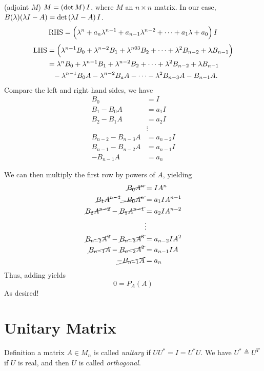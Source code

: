 \documentclass{article}
\begin{document}
(adjoint \(M\)) \(M = \del{\det M} I\), where \(M\) an \(n \times n\) matrix.
In our case,\(B(\lambda)(\lambda I - A) = \det \del{\lambda I - A} I\).
\[\mathrm{RHS} = \del{\lambda^n + a_n \lambda^{n-1} + a_{n-1}\lambda^{n-2} + \cdots + a_1 \lambda + a_0}I\]
\begin{align*}
  \mathrm{LHS} &= \del{\lambda^{n-1}B_0 + \lambda^{n-2}B_1 + \lambda^{n03}B_2 + \cdots + \lambda^2 B_{n-2} + \lambda B_{n-1}}\\
               &= \lambda^n B_0 + \lambda^{n-1} B_1 + \lambda^{n-2}B_2 + \cdots + \lambda^2 B_{n-2} + \lambda B_{n-1}\\
  &\phantom{=} - \lambda^{n-1} B_0 A - \lambda^{n-2}B_a A - \cdots - \lambda^{2}B_{n-3}A - B_{n-1}A.
\end{align*}
Compare the left and right hand sides, we have
\begin{align*}
  B_0 &= I\\
  B_1 - B_0A &= a_1 I\\
  B_2 - B_1 A &= a_2 I\\
     &\vdots\\
  B_{n-2} - B_{n-3}A &= a_{n-2}I\\
  B_{n-1} - B_{n-2}A&= a_{n-1}I\\
  -B_{n-1}A &= a_n
\end{align*}

We can then multiply the first row by powers of \(A\), yielding
\begin{align*}
  \cancel{B_0 A^n}&= IA^n\\
  \cancel{B_1A^{n-1}} \cancel{- B_0A^n} &= a_1 IA^{n-1}\\
  \cancel{B_2A^{n-2}} - \cancel{B_1 A^{n-1}} &= a_2 IA^{n-2}\\
      &\vdots\\
  \cancel{B_{n-2}A^2} - \cancel{B_{n-3}A^3} &= a_{n-2}IA^2\\
  \cancel{B_{n-1}A} - \cancel{B_{n-2}A^2}&= a_{n-1}IA\\
  \cancel{-B_{n-1}A} &= a_n
\end{align*}
Thus, adding yields
\[ 0 = P_A(A)\]
As desired!

\section{Unitary Matrix}
Definition a matrix \(A \in M_n\)  is called \textit{unitary} if \(UU^* = I = U^*U\).
We have \(U^* \triangleq U^T\) if \(U\) is real, and then \(U\) is called \textit{orthogonal}.
\end{document}
